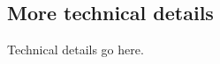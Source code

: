\documentclass[article]{jss}
\begin{document}





\newpage

\begin{appendix}

\section{More technical details} \label{app:technical}

%

Technical details go here. 



\end{appendix}
\end{document}
